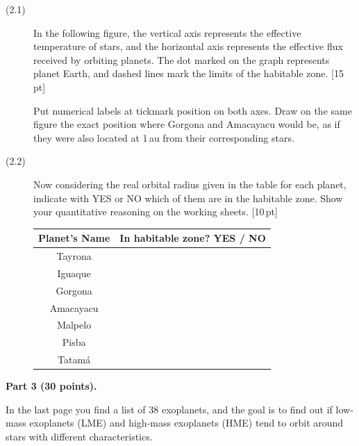 \begin{description}
\item[(2.1)] In the following figure, the vertical axis represents the
  effective temperature of stars, and the horizontal axis represents the
  effective flux received by orbiting planets. The dot marked on the graph
  represents planet Earth, and dashed lines mark the limits of the habitable
  zone. \hfill[15\,pt]


  Put numerical labels at tickmark position on both axes. Draw on the same
  figure the exact position where Gorgona and Amacayacu would be, as if they
  were also located at 1\,au from their corresponding stars.
\item[(2.2)] Now considering the real orbital radius given in the table for
  each planet, indicate with YES or NO which of them are in the habitable
  zone. Show your quantitative reasoning on the working
  sheets. \hfill[10\,pt]

  \begin{center}
  \begin{tabular}{cc}
  \toprule
  Planet's Name & In habitable zone? YES / NO\\
  \midrule
  Tayrona   & \\
  Iguaque   & \\
  Gorgona   & \\
  Amacayacu & \\
  Malpelo   & \\
  Pisba     & \\
  Tatam\'a  & \\
  \bottomrule
  \end{tabular}
  \end{center}
\end{description}

\medskip
\noindent\textbf{Part 3 (30 points).}

In the last page you find a list of 38 exoplanets, and the goal is to find out
if low-mass exoplanets (LME) and high-mass exoplanets (HME) tend to orbit
around stars with different characteristics.

